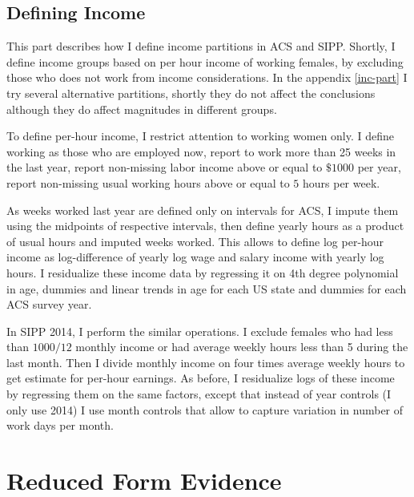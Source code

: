 \documentclass[12pt,letter]{article}
\begin{document}

\subsection{Defining Income}
This part describes how I define income partitions in ACS and SIPP. Shortly, I define income groups based on per hour income of working females, by excluding those who does not work from income considerations. In the appendix \ref{inc-part} I try several alternative partitions, shortly they do not affect the conclusions although they do affect magnitudes in different groups. 

To define per-hour income, I restrict attention to working women only. I define working as those who are employed now, report to work more than 25 weeks in the last year, report non-missing labor income above or equal to $\$1000$ per year, report non-missing usual working hours above or equal to $5$ hours per week.

As weeks worked last year are defined only on intervals for ACS, I impute them using the midpoints of respective intervals, then define yearly hours as a product of usual hours and imputed weeks worked. This allows to define log per-hour income as log-difference of yearly log wage and salary income with yearly log hours. I residualize these income data by regressing it on 4th degree polynomial in age, dummies and linear trends in age for each US state and dummies for each ACS survey year.

In SIPP 2014, I perform the similar operations. I exclude females who had less than $1000/12$ monthly income or had average weekly hours less than 5 during the last month. Then I divide monthly income on four times average weekly hours to get estimate for per-hour earnings. As before, I residualize logs of these income by regressing them on the same factors, except that instead of year controls (I only use 2014) I use month controls that allow to capture variation in number of work days per month. 

\section{Reduced Form Evidence}
\end{document}
